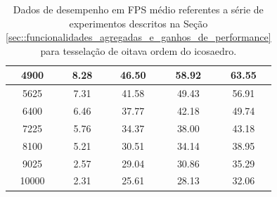 \documentclass[
    12pt,                %
    oneside,            %
    a4paper,            %
    english,            %
    french,                %
    spanish,            %
    brazil                %
    ]{abntex2}
\begin{document}
\begin{apendicesenv}
\begin{table}[htb]
\begin{tabular}{c|c|c|c|c|}
\multicolumn{1}{|c|}{4900}      &    8.28              &  46.50         &  58.92                &  63.55              \\ \hline
\multicolumn{1}{|c|}{5625}      &    7.31              &  41.58         &  49.43                &  56.91              \\ \hline
\multicolumn{1}{|c|}{6400}      &    6.46              &  37.77         &  42.18                &  49.74              \\ \hline
\multicolumn{1}{|c|}{7225}      &    5.76              &  34.37         &  38.00                &  43.18              \\ \hline
\multicolumn{1}{|c|}{8100}      &    5.21              &  30.51         &  34.14                &  38.95              \\ \hline
\multicolumn{1}{|c|}{9025}      &    2.57              &  29.04         &  30.86                &  35.29              \\ \hline
\multicolumn{1}{|c|}{10000}     &    2.31              &  25.61         &  28.13                &  32.06              \\ \hline
\end{tabular}
\caption{Dados de desempenho em FPS médio referentes a série de experimentos descritos na Seção \ref{sec::funcionalidades_agregadas_e_ganhos_de_performance} para tesselação de oitava ordem do icosaedro.}
\label{tab::testes_8}
\end{table}





\end{apendicesenv}
\end{document}
